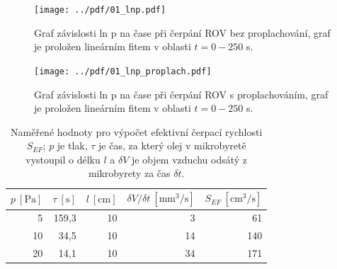 \documentclass[english]{article}
\newcommand{\unit}[1]{\mathrm{#1}}
\begin{document}
\begin{figure}[h!]
	\begin{center}
		\vspace*{-1cm}
		\texttt{[image: ../pdf/01\_lnp.pdf]}
		\vspace*{-0,7cm}
		\caption{Graf závislosti ln p na čase při čerpání ROV bez proplachování, graf je proložen lineárním fitem v oblasti $ t = 0-250 $ s.}
		\label{lnp}
	\end{center}
\end{figure}

\begin{figure}[h!]
	\begin{center}
		\vspace*{-1cm}
		\texttt{[image: ../pdf/01\_lnp\_proplach.pdf]}
		\vspace*{-0,7cm}
		\caption{Graf závislosti ln p na čase při čerpání ROV s proplachováním, graf je proložen lineárním fitem v oblasti $ t = 0 - 250 $ s.}
		\label{lnp_proplach}
	\end{center}
\end{figure}

\begin{table}[h!]
	\centering
	\begin{tabular}{|r|r|r|r|r|}
		\hline
		$p~\unit{[Pa]}$ & $\tau~\unit{[s]}$ & $l~\unit{[cm]}$ & $\delta V/\delta t~\unit{[mm^3/s]}$ & $S_{EF}~\unit{[cm^3/s]}$ \bigstrut\\
		\hline
		5     & 159,3 & 10    & 3     & 61 \bigstrut\\
		\hline
		10    & 34,5  & 10    & 14    & 140 \bigstrut\\
		\hline
		20    & 14,1  & 10    & 34    & 171 \bigstrut\\
		\hline
	\end{tabular}%
	
	\caption{Naměřené hodnoty pro výpočet efektivní čerpací rychlosti  $S_{EF}$; $ p $ je tlak, $\tau$ je čas, za který olej v mikrobyretě vystoupil o délku $ l $ a $ \delta V $ je objem vzduchu odsátý z mikrobyrety za čas $ \delta t $.}
	\label{efektivni_cerpani}
	
\end{table}
\end{document}

